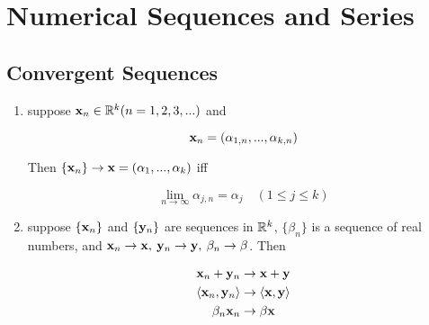 \section{Numerical Sequences and Series}

\subsection{Convergent Sequences}

\begin{thm}
    \label{thm:3-1-1}
    \begin{enumerate}
        \item suppose $\mathbf{x}_n \in \mathbb{R}^k(n=1,2,3,...)$ and 

        \[
            \mathbf{x}_n = (\alpha_{1,n},...,\alpha_{k,n})
        \]

        Then $\{ \mathbf{x}_n \} \to \mathbf{x} = (\alpha_1,...,\alpha_k)$ iff 

        \[
            \lim_{n \to \infty}\alpha_{j,n} = \alpha_j \quad (1 \le j \le k)
        \]

        \item suppose $\{ \mathbf{x}_n \}$ and $\{ \mathbf{y}_n \}$ are sequences in $\mathbb{R}^k$, $\{ \beta_n\}$ 
        is a sequence of real numbers, and $\mathbf{x}_n \to \mathbf{x},\: \mathbf{y}_n \to \mathbf{y},\: \beta_n \to \beta$. Then

        \begin{align*}
            \mathbf{x}_n + \mathbf{y}_n & \to \mathbf{x} + \mathbf{y} \\
            \langle \mathbf{x}_n, \mathbf{y}_n \rangle &\to \langle \mathbf{x}, \mathbf{y} \rangle \\
            \beta_n \mathbf{x}_n & \to \beta \mathbf{x}
        \end{align*}
    \end{enumerate}
\end{thm}

